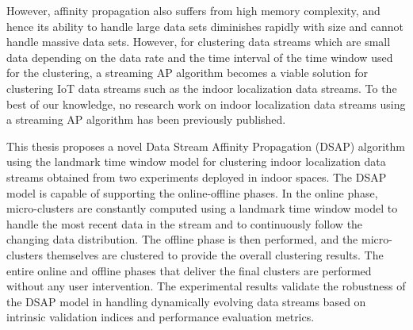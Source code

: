 However, affinity propagation also suffers from high memory complexity, and hence its ability to handle large data sets diminishes rapidly with size and cannot handle massive data sets. However, for clustering data streams which are small data depending on the data rate and the time interval of the time window used for the clustering, a streaming AP algorithm becomes a viable solution for clustering IoT data streams such as the indoor localization data streams. To the best of our knowledge, no research work on indoor localization data streams using a streaming AP algorithm has been previously published.

This thesis proposes a novel Data Stream Affinity Propagation (DSAP) algorithm using the landmark time window model for clustering indoor localization data streams obtained from two experiments deployed in indoor spaces. The DSAP model is capable of supporting the online-offline phases. In the online phase, micro-clusters are constantly computed using a landmark time window model to handle the most recent data in the stream and to continuously follow the changing data distribution. The offline phase is then performed, and the micro-clusters themselves are clustered to provide the overall clustering results. The entire online and offline phases that deliver the final clusters are performed without any user intervention. The experimental results validate the robustness of the DSAP model in handling dynamically evolving data streams based on intrinsic validation indices and performance evaluation metrics.



